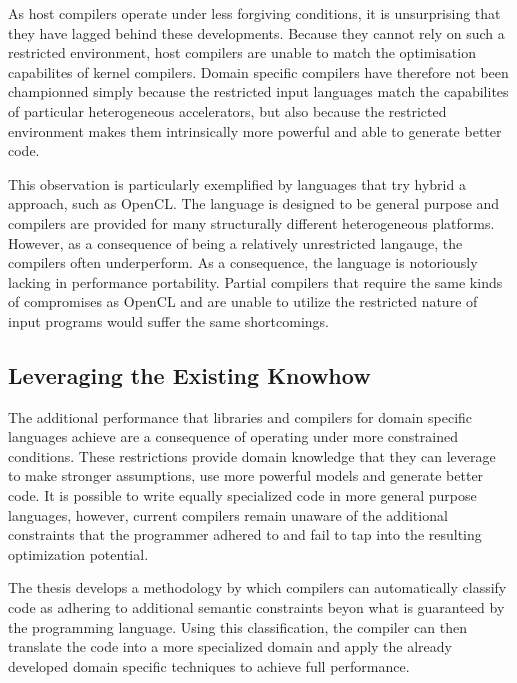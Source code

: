     As host compilers operate under less forgiving conditions, it is
    unsurprising that they have lagged behind these developments.
    Because they cannot rely on such a restricted environment, host compilers
    are unable to match the optimisation capabilites of kernel compilers.
    Domain specific compilers have therefore not been championned simply because
    the restricted input languages match the capabilites of particular
    heterogeneous accelerators, but also because the restricted environment
    makes them intrinsically more powerful and able to generate better code.

    This observation is particularly exemplified by languages that try hybrid a
    approach, such as OpenCL.
    The language is designed to be general purpose and compilers are provided
    for many structurally different heterogeneous platforms.
    However, as a consequence of being a relatively unrestricted langauge, the
    compilers often underperform.
    As a consequence, the language is notoriously lacking in performance
    portability.
    Partial compilers that require the same kinds of compromises as OpenCL and
    are unable to utilize the restricted nature of input programs would suffer
    the same shortcomings.

    \subsection*{Leveraging the Existing Knowhow}

    The additional performance that libraries and compilers for domain specific
    languages achieve are a consequence of operating under more constrained
    conditions.
    These restrictions provide domain knowledge that they can leverage to make
    stronger assumptions, use more powerful models and generate better code.
    It is possible to write equally specialized code in more general
    purpose languages, however, current compilers remain unaware of the
    additional constraints that the programmer adhered to and fail to tap into
    the resulting optimization potential.


    The thesis develops a methodology by which compilers can automatically
    classify code as adhering to additional semantic constraints beyon what is
    guaranteed by the programming language.
    Using this classification, the compiler can then translate the code into a
    more specialized domain and apply the already developed domain specific
    techniques to achieve full performance.





